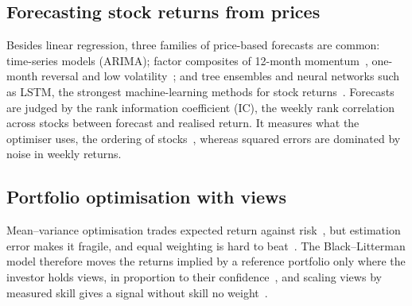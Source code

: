 \subsection{Forecasting stock returns from prices}
Besides linear regression, three families of price-based forecasts are common: time-series models (ARIMA); factor composites of 12-month momentum~\cite{jegadeesh}, one-month reversal and low volatility~\cite{grinoldkahn}; and tree ensembles and neural networks such as LSTM, the strongest machine-learning methods for stock returns~\cite{gukellyxiu}. Forecasts are judged by the rank information coefficient (IC), the weekly rank correlation across stocks between forecast and realised return. It measures what the optimiser uses, the ordering of stocks~\cite{grinoldkahn}, whereas squared errors are dominated by noise in weekly returns.

\subsection{Portfolio optimisation with views}
Mean--variance optimisation trades expected return against risk~\cite{markowitz}, but estimation error makes it fragile, and equal weighting is hard to beat~\cite{demiguel}. The Black--Litterman model therefore moves the returns implied by a reference portfolio only where the investor holds views, in proportion to their confidence~\cite{blacklitterman}, and scaling views by measured skill gives a signal without skill no weight~\cite{grinoldkahn}.

